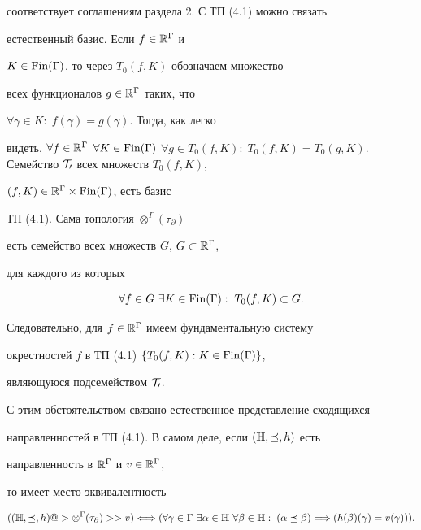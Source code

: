 соответствует соглашениям раздела 2. С ТП (4.1) можно связать


естественный базис. Если $f\in\Bbb R^\Gamma$ и


$K\in \operatorname{Fin}(\Gamma)$, то через $T_0(f,K)$ обозначаем множество


всех функционалов $g\in\Bbb R^\Gamma$ таких, что


$\forall\gamma\in K:\;f(\gamma)=g(\gamma)$. Тогда, как легко


видеть, $\forall f\in\Bbb R^\Gamma$ $\forall K\in


\Fin(\Gamma)$ $\forall g\in T_0(f,K):\;T_0(f,K)=


T_0(g,K)$. Семейство $\cal T_0$ всех множеств $T_0(f,K)$,


$(f,K)\in\Bbb R^\Gamma\times \operatorname{Fin}(\Gamma)$, есть базис


ТП (4.1). Сама топология $\otimes^\Gamma(\tau_\partial)$


есть семейство всех множеств $G$, $G\subset\Bbb R^\Gamma$,


для каждого из которых


$$


\forall f\in G\ \exists K\in \Fin(\Gamma):\;T_0(f,K)\subset G.


$$


Следовательно, для $f\in\Bbb R^\Gamma$ имеем фундаментальную систему


окрестностей $f$ в ТП (4.1) $\{T_0(f,K):K \in \operatorname{Fin}(\Gamma)\}$, 


являющуюся подсемейством $\cal T_0$.


С этим обстоятельством связано естественное представление сходящихся


направленностей в ТП (4.1). В самом деле, если $(\Bbb H,\preceq,h)$ есть


направленность в $\Bbb R^\Gamma$ и $v\in\Bbb R^\Gamma$,


то имеет место эквивалентность


\begin{equation}


((\Bbb H,\preceq,h)@>\otimes^\Gamma(\tau_\partial)>> v)


\Longleftrightarrow(\forall\gamma\in\Gamma\ \exists\alpha\in


\Bbb H\ \forall\beta\in\Bbb H:\;


(\alpha\preceq\beta)\Longrightarrow(h(\beta)(\gamma)=v(\gamma))).


\end{equation}


